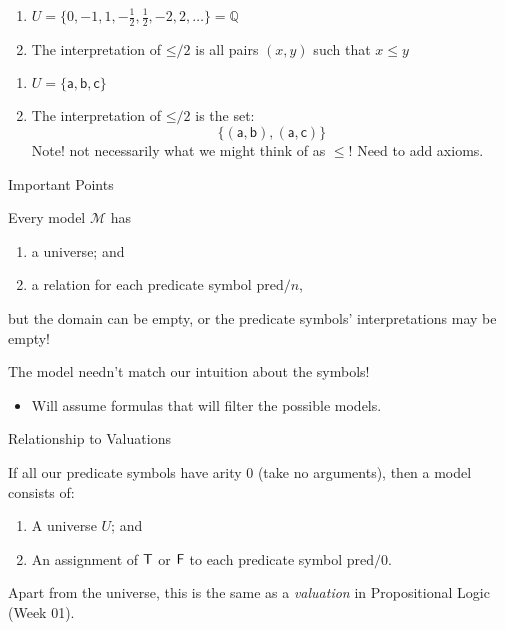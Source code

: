 \documentclass[xetex,aspectratio=169,14pt,hyperref={pdfpagelabels=true,pdflang={en-GB}}]{beamer}
\begin{document}
\begin{frame}
  \begin{enumerate}
  \item $U = \{ 0, -1, 1, -\frac{1}{2}, \frac{1}{2}, -2, 2, \dots \} = \mathbb{Q}$
  \item The interpretation of $\mathord{\leq}/2$ is all pairs $(x, y)$ such that $x \leq y$
  \end{enumerate}
\end{frame}

\begin{frame}
  \begin{enumerate}
  \item $U = \{ \mathsf{a}, \mathsf{b}, \mathsf{c} \}$
  \item The interpretation of $\mathord{\leq}/2$ is the set:
    \begin{displaymath}
      \{ (\mathsf{a},\mathsf{b}), (\mathsf{a},\mathsf{c}) \}
    \end{displaymath}
    Note! not necessarily what we might think of as $\leq$! Need to
    add axioms.
  \end{enumerate}
\end{frame}

\begin{frame}
  {Important Points}


  Every model $\mathcal{M}$ has
  \begin{enumerate}
  \item a universe; and
  \item a relation for each predicate symbol $\mathrm{pred}/n$,
  \end{enumerate}
  but the domain can be empty, or the predicate symbols' interpretations may be empty!

  \bigskip

  The model needn't match our intuition about the symbols!
  \begin{itemize}
  \item Will assume formulas that will filter the possible models.
  \end{itemize}
\end{frame}

\begin{frame}
  {Relationship to Valuations}

  \bigskip

  If all our predicate symbols have arity $0$ (take no arguments),
  then a model consists of:
  \begin{enumerate}
  \item A universe $U$; and
  \item An assignment of $\mathsf{T}$ or $\mathsf{F}$ to each predicate symbol
    $\mathrm{pred}/0$.
  \end{enumerate}

  \bigskip

  Apart from the universe, this is the same as a \emph{valuation} in
  Propositional Logic (Week 01).
\end{frame}
\end{document}
